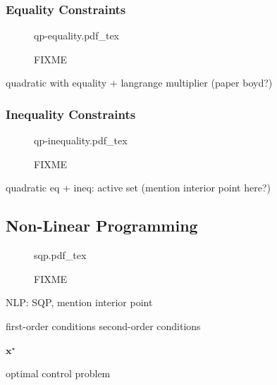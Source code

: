 \subsubsection{Equality Constraints}

\begin{figure}
  \centering
      {\def\svgwidth{0.9\linewidth}
        {\footnotesize
          
                     {qp-equality.pdf_tex}
        }
      }
      \caption{FIXME}
      \label{fig:chap3-qp-equality}
\end{figure}

quadratic with equality + langrange multiplier (paper boyd?)

\subsubsection{Inequality Constraints}

\begin{figure}
  \centering
      {\def\svgwidth{0.9\linewidth}
        {\footnotesize
          
                     {qp-inequality.pdf_tex}
        }
      }
      \caption{FIXME}
      \label{fig:chap3-qp-inequality}
\end{figure}

quadratic eq + ineq: active set (mention interior point here?)

\subsection{Non-Linear Programming}

\begin{figure}
  \centering
      {\def\svgwidth{0.9\linewidth}
        {\footnotesize
          
                     {sqp.pdf_tex}
        }
      }
      \caption{FIXME}
      \label{fig:chap3-sqp}
\end{figure}

NLP: SQP, mention interior point

first-order conditions
second-order conditions

$\mathbf{x}^\star$

optimal control problem

